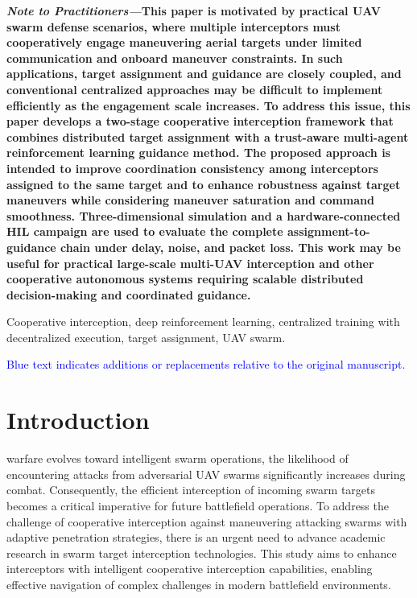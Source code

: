 \documentclass[lettersize,journal]{IEEEtran}
\providecommand{\DIFadd}[1]{{\protect\color{blue} #1}} %
\providecommand{\DIFaddbegin}{} %
\providecommand{\DIFaddend}{} %
\begin{document}
{\linespread{0.9}\selectfont
\hspace*{0.0em}\textbf{\textit{Note to Practitioners—}}\textbf{This paper is motivated by practical UAV swarm defense scenarios, where multiple interceptors must cooperatively engage maneuvering aerial targets under limited communication and onboard maneuver constraints. In such applications, target assignment and guidance are closely coupled, and conventional centralized approaches may be difficult to implement efficiently as the engagement scale increases. To address this issue, this paper develops a two-stage cooperative interception framework that combines distributed target assignment with a trust-aware multi-agent reinforcement learning guidance method. The proposed approach is intended to improve coordination consistency among interceptors assigned to the same target and to enhance robustness against target maneuvers while considering maneuver saturation and command smoothness. \DIFaddbegin \DIFadd{Three-dimensional simulation and a hardware-connected HIL campaign are used to evaluate the complete assignment-to-guidance chain under delay, noise, and packet loss. }\DIFaddend This work may be useful for practical large-scale multi-UAV interception and other cooperative autonomous systems requiring scalable distributed decision-making and coordinated guidance.}\par\vspace{0.5\baselineskip}
}

\begin{IEEEkeywords}
Cooperative interception, deep reinforcement learning, centralized training with decentralized
execution, target assignment, UAV swarm.
\end{IEEEkeywords}

\begin{center}
\footnotesize\textcolor{blue}{Blue text indicates additions or replacements relative to the original manuscript.}
\end{center}


\section{Introduction}
\label{sec:introduction}
 warfare evolves toward intelligent swarm operations, the likelihood of
encountering attacks from adversarial UAV swarms significantly increases during combat.
Consequently, the efficient interception of incoming swarm targets becomes a critical
imperative for future battlefield operations.
To address the challenge of cooperative interception against maneuvering attacking swarms with
adaptive penetration strategies, there is an urgent need to advance academic research in swarm
target interception technologies.
This study aims to enhance interceptors with intelligent cooperative interception capabilities,
enabling effective navigation of complex challenges in modern battlefield environments.
\end{document}
